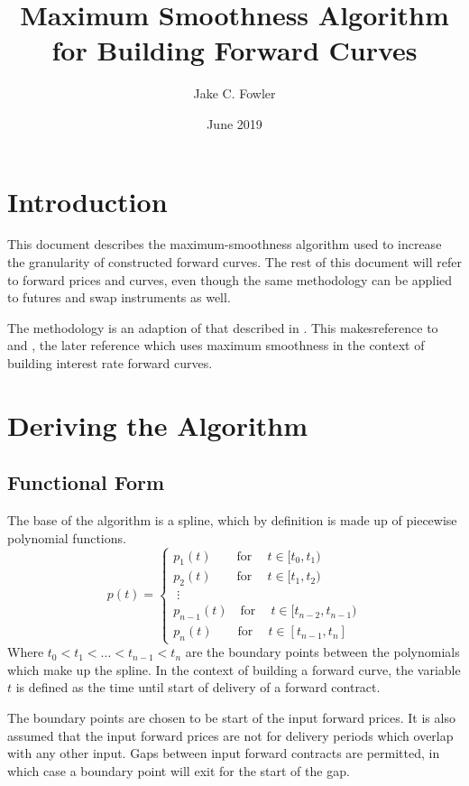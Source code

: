 \documentclass{article}
\title{Maximum Smoothness Algorithm for Building Forward Curves}
\author{Jake C. Fowler}
\date{June 2019}
\begin{document}
\newcommand{\+}[1]{\ensuremath{\mathbf{#1}}}

\maketitle

\section{Introduction}
This document describes the maximum-smoothness algorithm used to increase the granularity of constructed forward curves.
The rest of this document will refer to forward prices and curves, even though the same methodology can be applied to futures and swap instruments as well.

\bigskip
The methodology is an adaption of that described in \citep{Unknown}. 
This makesreference to \cite{Benth} and \cite{Lim}, the later reference which uses maximum smoothness
in the context of building interest rate forward curves.

\section{Deriving the Algorithm}
\subsection{Functional Form}
The base of the algorithm is a spline, which by definition is made up of piecewise polynomial functions.
\begin{equation}
p(t) = 
\begin{cases}
    p_1(t)\qquad \text{for}\ \quad t \in [t_0, t_1) \\
    p_2(t)\qquad \text{for}\ \quad t \in [t_1, t_2) \\
    \;\vdots \\
    p_{n-1}(t)\quad \text{for}\ \quad t \in [t_{n-2}, t_{n-1}) \\
    p_n(t)\qquad \text{for}\ \quad t \in [t_{n-1}, t_n]
\end{cases}
\end{equation}
Where $t_0 < t_1 < \hdots < t_{n-1} < t_{n}$ are the boundary points between the polynomials which make up the spline.
In the context of building a forward curve, the variable $t$ is defined as
the time until start of delivery of a forward contract.

\bigskip

The boundary points are chosen to be start of the input forward prices. It is also
assumed that the input forward prices are not for delivery periods which overlap
with any other input. Gaps between input forward contracts are permitted, in which
case a boundary point will exit for the start of the gap.
\end{document}
